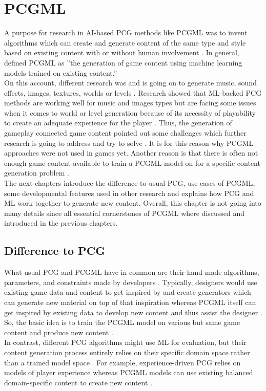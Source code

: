 \documentclass[MGS,Master,english]{twbook}%
\begin{document}
%
%
\clearpage
\chapter{\acl{PCGML}}
A purpose for research in AI-based PCG methods like PCGML was to invent algorithms which can create and generate content of the same type and style based on existing content with or without human involvement \cite{ai::book} \cite{pcgml::paper}. In general, \cite{pcgml::paper} defined PCGML as ''the generation of game content using machine learning models trained on existing content.'' \\
On this account, different research was and is going on to generate music, sound effects, images, textures, worlds or levels \cite{ai::book}. Research showed that ML-backed PCG methods are working well for music and images types but are facing some issues when it comes to world or level generation because of its necessity of playability to create an adequate experience for the player \cite{ai::book}. Thus, the generation of gameplay connected game content pointed out some challenges which further research is going to address and try to solve \cite{ai::book}. It is for this reason why PCGML approaches were not used in games yet. Another reason is that there is often not enough game content available to train a PCGML model on for a specific content generation problem \cite{ai::book}. \\
The next chapters introduce the difference to usual PCG, use cases of PCGML, some developmental features used in other research and explains how PCG and ML work together to generate new content. Overall, this chapter is not going into many details since all essential cornerstones of PCGML where discussed and introduced in the previous chapters.

\section{Difference to \acl{PCG}}
What usual PCG and PCGML have in common are their hand-made algorithms, parameters, and constraints made by developers \cite{pcgml::paper}. Typically, designers would use existing game data and content to get inspired by and create generators which can generate new material on top of that inspiration whereas PCGML itself can get inspired by existing data to develop new content and thus assist the designer \cite{pcgml::paper}. So, the basic idea is to train the PCGML model on various but same game content and produce new content \cite{pcgml::paper}. \\
In contrast, different PCG algorithms might use ML for evaluation, but their content generation process entirely relies on their specific domain space rather than a trained model space \cite{pcgml::paper}. For example, experience-driven PCG relies on models of player experience whereas PCGML models can use existing balanced domain-specific content to create new content \cite{pcgml::paper}.
\end{document}
